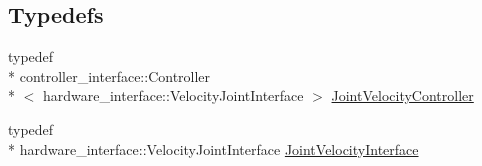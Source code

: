 \subsection*{Typedefs}
\begin{DoxyCompactItemize}
\item 
typedef \\*
controller\-\_\-interface\-::\-Controller\\*
$<$ hardware\-\_\-interface\-::\-Velocity\-Joint\-Interface $>$ \hyperlink{namespacehiqp_a7b250295f6797153486ce8ab085bd450}{Joint\-Velocity\-Controller}
\item 
typedef \\*
hardware\-\_\-interface\-::\-Velocity\-Joint\-Interface \hyperlink{namespacehiqp_ac536ca3b4ba33489281fa5bec490799c}{Joint\-Velocity\-Interface}
\end{DoxyCompactItemize}
